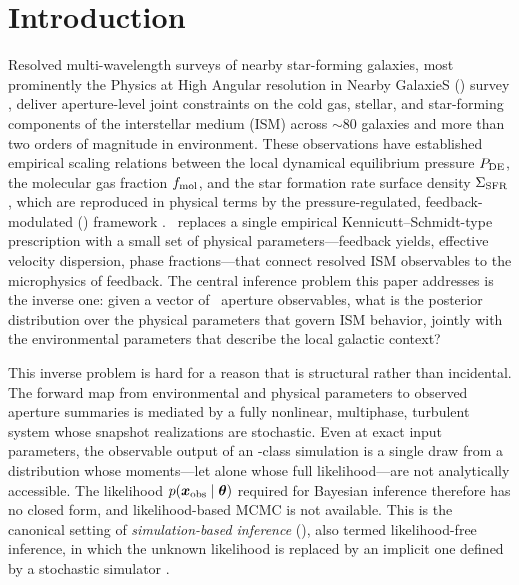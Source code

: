 \section{Introduction}
\label{sec:intro}

Resolved multi-wavelength surveys of nearby star-forming galaxies, most
prominently the Physics at High Angular resolution in Nearby GalaxieS
(\PHANGS) survey \citep{2021ApJS..255...19L,2023AJ....166..145L},
deliver aperture-level joint constraints on the cold gas, stellar, and
star-forming components of the interstellar medium (ISM) across
$\sim80$ galaxies and more than two orders of magnitude in environment.
These observations have established empirical scaling relations between
the local dynamical equilibrium pressure $P_{\rm DE}$, the molecular gas
fraction $f_{\rm mol}$, and the star formation rate surface density $\Sigma_{\rm SFR}$
\citep{2020ApJ...892..148S,2023ApJ...945L..19S,2025ApJ...989...66V},
which are reproduced in physical terms by the pressure-regulated,
feedback-modulated (\PRFM) framework \citep{2022ApJ...936..137O}.
\PRFM\ replaces a single empirical Kennicutt--Schmidt-type prescription
with a small set of physical parameters---feedback yields, effective
velocity dispersion, phase fractions---that connect resolved ISM
observables to the microphysics of feedback. The central inference
problem this paper addresses is the inverse one: given a vector of
\PHANGS\ aperture observables, what is the posterior distribution over
the physical parameters that govern ISM behavior, jointly with the
environmental parameters that describe the local galactic context?

This inverse problem is hard for a reason that is structural rather
than incidental. The forward map from environmental and physical
parameters to observed aperture summaries is mediated by a fully
nonlinear, multiphase, turbulent system whose snapshot realizations are
stochastic. Even at exact input parameters, the observable output of an
\TIGRESS-class simulation is a single draw from a distribution whose
moments---let alone whose full likelihood---are not analytically
accessible. The likelihood $p(\bm{x}_{\rm obs} \mid \bm{\theta})$
required for Bayesian inference therefore has no closed form, and
likelihood-based MCMC is not available. This is the canonical setting
of \emph{simulation-based inference} (\SBI), also termed
likelihood-free inference, in which the unknown likelihood is replaced
by an implicit one defined by a stochastic simulator
\citep{2020PNAS..11730055C}.


